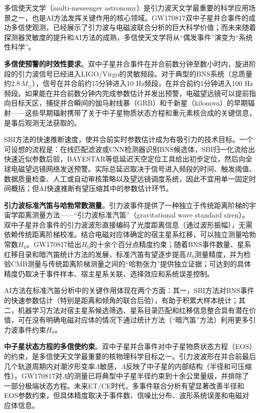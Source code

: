 多信使天文学（multi-messenger astronomy）是引力波天文学最重要的科学应用场景之一，也是AI方法发挥关键作用的核心领域。GW170817双中子星并合事件的成功多信使观测，已经展示了引力波与电磁波联合分析的巨大科学价值；而未来随着探测器灵敏度的提升和AI方法的成熟，多信使天文学将从“偶发事件”演变为“系统性科学”。

\textbf{多信使预警的时效性要求}。双中子星并合事件在并合前数分钟至数小时内，旋进阶段的引力波信号已经进入LIGO/Virgo的灵敏频段。对于典型的BNS系统（总质量约$2.8\,M_\odot$），信号在并合前约15分钟进入10 Hz频段，在并合前约1分钟进入100 Hz频段。如果能在并合前数分钟内完成参数估计并发出预警，电磁望远镜可以提前指向目标天区，捕捉并合瞬间的伽马射线暴（GRB）和千新星（kilonova）的早期辐射——这些早期辐射携带了关于中子星物质状态方程和重元素核合成的关键信息，是事后观测无法获取的。

SBI方法的快速推断速度，使并合前实时参数估计成为有吸引力的技术目标。一个可设想的流程是：在线匹配滤波或CNN检测器识别BNS候选体，SBI归一化流给出快速近似参数后验，BAYESTAR等低延迟天空定位工具给出初步定位，然后向全球电磁望远镜网络发送预警。实际总延迟取决于信号进入频段的时间、触发阈值、数据质量检查、人工或自动审核策略以及望远镜调度系统，因此不宜用单一固定时间概括；但AI快速推断有望压缩其中的参数估计环节。

\textbf{引力波标准汽笛与哈勃常数测量}。引力波事件提供了一种独立于传统距离阶梯的宇宙学距离测量方法——“引力波标准汽笛”（gravitational wave standard siren）。双中子星并合事件的引力波波形直接编码了光度距离信息（通过波形振幅），无需依赖传统距离阶梯校准。结合电磁对应体确定的宿主星系红移，可以独立测量哈勃常数$H_0$。GW170817给出$H_0$的十余个百分点精度约束；随着BNS事件数量、星系红移目录和暗汽笛统计方法的发展，标准汽笛有望逐步提高$H_0$测量精度，并为检验CMB测量与传统距离阶梯测量之间的“哈勃张力”提供独立证据；可达到的具体精度仍取决于事件样本、宿主星系关联、选择效应和系统误差控制。

AI方法在标准汽笛分析中的关键作用体现在两个方面：其一，SBI方法对BNS事件的快速参数估计（特别是距离和倾角的联合后验），有助于积累大样本统计；其二，机器学习方法对宿主星系候选筛选、星系目录匹配和红移信息整合具有潜在价值，可在没有明确电磁对应体的情况下通过统计方法（“暗汽笛”方法）利用更多引力波事件约束$H_0$。

\textbf{中子星状态方程的多信使约束}。双中子星并合事件对中子星物质状态方程（EOS）的约束，是多信使天文学最重要的核物理科学目标之一。引力波波形在并合前最后几个轨道周期内对潮汐形变率$\Lambda$敏感，$\Lambda$反映了中子星的内部结构（半径和可压缩性）。GW170817对$\Lambda$的测量已将典型中子星半径约束到十余公里量级，并排除了一部分极端状态方程。未来ET/CE时代，多事件联合分析有望显著改善半径和EOS参数约束，但具体精度取决于事件数、信噪比分布、波形系统误差和电磁对应体信息。

